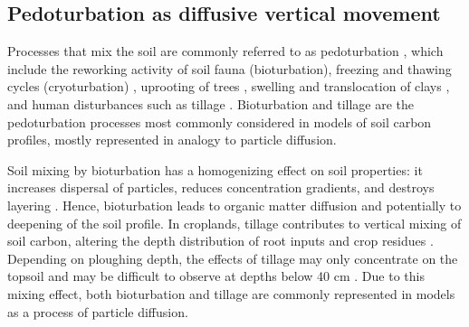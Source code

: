 \documentclass[11pt, oneside, a4paper]{article}   	%
\begin{document}
\subsection{Pedoturbation as diffusive vertical movement}
Processes that mix the soil are commonly referred to as pedoturbation \citep{Hole1961, Martin2017}, which include the reworking activity of soil fauna (bioturbation), freezing and thawing cycles (cryoturbation) \citep{Johnson1987, Bockheim2007, Beer2022},  uprooting of trees \citep{Schaetzl1990}, swelling and translocation of clays \citep{Finke2012}, and human disturbances such as tillage \citep{Martin2017, Keyvanshokouhi2019}. Bioturbation and tillage are the pedoturbation processes most commonly considered in models of soil carbon profiles, mostly represented in analogy to particle diffusion. 


Soil mixing by bioturbation has a homogenizing effect on soil properties: it increases
dispersal of particles, reduces concentration gradients, and destroys layering \citep{Johnson1987}. Hence, bioturbation leads to organic matter diffusion and potentially to deepening of the soil profile. 
In croplands, tillage contributes to vertical mixing of soil carbon, altering the depth distribution of root inputs and crop residues \citep{Luo2010}. Depending on ploughing depth, the effects of tillage may only concentrate on the topsoil and may be difficult to observe at depths below 40 cm \citep{Luo2010,Keyvanshokouhi2019, Mary2020}. Due to this mixing effect, both bioturbation and tillage are commonly represented in models as a process of particle diffusion. 
\end{document}
